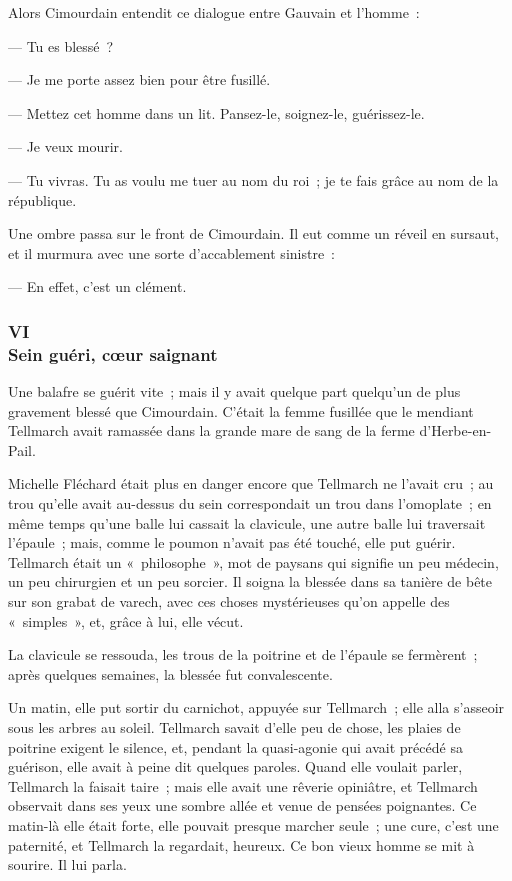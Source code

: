 \documentclass[french,twoside]{book} %
\begin{document}
Alors Cimourdain entendit ce dialogue entre Gauvain et l’homme :\par
— Tu es blessé ?\par
— Je me porte assez bien pour être fusillé.\par
— Mettez cet homme dans un lit. Pansez-le, soignez-le, guérissez-le.\par
— Je veux mourir.\par
— Tu vivras. Tu as voulu me tuer au nom du roi ; je te fais grâce au nom de la république.\par
Une ombre passa sur le front de Cimourdain. Il eut comme un réveil en sursaut, et il murmura avec une sorte d’accablement sinistre :\par
— En effet, c’est un clément.
 \subsubsection[{VI. Sein guéri, cœur saignant}]{VI \\
Sein guéri, cœur saignant}
\label{p3l2c6}
\noindent Une balafre se guérit vite ; mais il y avait quelque part quelqu’un de plus gravement blessé que Cimourdain. C’était la femme fusillée que le mendiant Tellmarch avait ramassée dans la grande mare de sang de la ferme d’Herbe-en-Pail.\par
Michelle Fléchard était plus en danger encore que Tellmarch ne l’avait cru ; au trou qu’elle avait au-dessus du sein correspondait un trou dans l’omoplate ; en même temps qu’une balle lui cassait la clavicule, une autre balle lui traversait l’épaule ; mais, comme le poumon n’avait pas été touché, elle put guérir. Tellmarch était un « philosophe », mot de paysans qui signifie un peu médecin, un peu chirurgien et un peu sorcier. Il soigna la blessée dans sa tanière de bête sur son grabat de varech, avec ces choses mystérieuses qu’on appelle des « simples », et, grâce à lui, elle vécut.\par
La clavicule se ressouda, les trous de la poitrine et de l’épaule se fermèrent ; après quelques semaines, la blessée fut convalescente.\par
 Un matin, elle put sortir du carnichot, appuyée sur Tellmarch ; elle alla s’asseoir sous les arbres au soleil. Tellmarch savait d’elle peu de chose, les plaies de poitrine exigent le silence, et, pendant la quasi-agonie qui avait précédé sa guérison, elle avait à peine dit quelques paroles. Quand elle voulait parler, Tellmarch la faisait taire ; mais elle avait une rêverie opiniâtre, et Tellmarch observait dans ses yeux une sombre allée et venue de pensées poignantes. Ce matin-là elle était forte, elle pouvait presque marcher seule ; une cure, c’est une paternité, et Tellmarch la regardait, heureux. Ce bon vieux homme se mit à sourire. Il lui parla.\par
\end{document}
